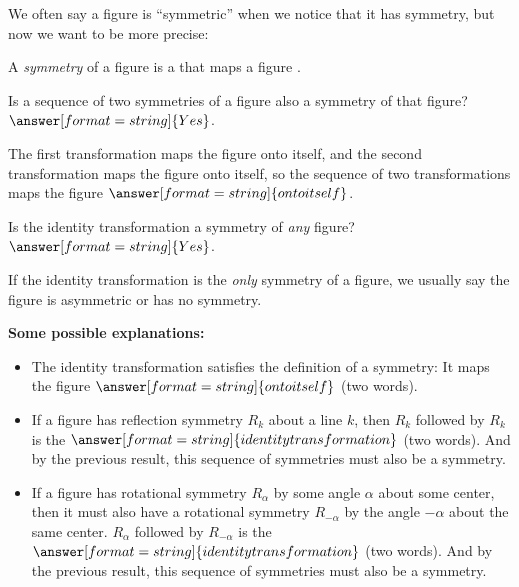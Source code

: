 \documentclass[nooutcomes]{ximera}
\begin{document}
\begin{question}
We often say a figure is ``symmetric'' when we notice that it has symmetry, but now we want to be more precise:  

A \emph{symmetry} of a figure is a
that maps a figure 
.  
\end{question}

\begin{question}
Is a sequence of two symmetries of a figure also a symmetry of that figure?
$\answer[format=string]{Yes}$.
\begin{question}
The first transformation maps the figure onto itself, and the second transformation maps the figure onto itself, so the sequence of two transformations maps the figure $\answer[format=string]{onto itself}$.  
\end{question}
\end{question}

\begin{question}
Is the identity transformation a symmetry of \emph{any} figure? 
$\answer[format=string]{Yes}$.
\begin{feedback}[correct]
If the identity transformation is the \emph{only} symmetry of a figure, we usually say the figure is asymmetric or has no symmetry.  
\end{feedback}
\begin{question}
\textbf{Some possible explanations:} 
\begin{itemize}
\item The identity transformation satisfies the definition of a symmetry: It maps the figure $\answer[format=string]{onto itself}$ (two words). 
\item If a figure has reflection symmetry $R_k$ about a line $k$, then $R_k$ followed by $R_k$ is the $\answer[format=string]{identity transformation}$ (two words).  And by the previous result, this sequence of symmetries must also be a symmetry.  
\item If a figure has rotational symmetry $R_\alpha$ by some angle $\alpha$ about some center, then it must also have a rotational symmetry $R_{-\alpha}$ by the angle $-\alpha$ about the same center.  $R_\alpha$ followed by $R_{-\alpha}$ is the $\answer[format=string]{identity transformation}$ (two words).  And by the previous result, this sequence of symmetries must also be a symmetry.  
\end{itemize}
\end{question}
\end{question}
\end{document}
